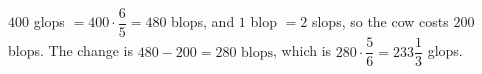 $400$ glops $=400\cdot\dfrac{6}{5}=480$ blops, and $1$ blop $=2$ slops, so the cow costs $200$ blops. The change is $480-200=\boxed{280\text{ blops}}$, which is $280\cdot\dfrac{5}{6}=233\dfrac{1}{3}$ glops.
